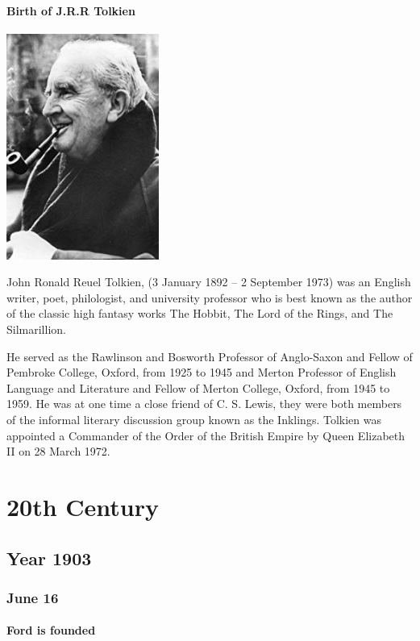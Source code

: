 \documentclass[11pt]{report}
\begin{document}
\subsection{Birth of J.R.R Tolkien}
\vspace{2mm}\begin{center}\includegraphics[width=5cm]{./img/jrrtolkien.jpg}\end{center}
John Ronald Reuel Tolkien, (3 January 1892 – 2 September 1973) was an English writer, poet, philologist, and university professor who is best known as the author of the classic high fantasy works The Hobbit, The Lord of the Rings, and The Silmarillion.

He served as the Rawlinson and Bosworth Professor of Anglo-Saxon and Fellow of Pembroke College, Oxford, from 1925 to 1945 and Merton Professor of English Language and Literature and Fellow of Merton College, Oxford, from 1945 to 1959. He was at one time a close friend of C. S. Lewis, they were both members of the informal literary discussion group known as the Inklings. Tolkien was appointed a Commander of the Order of the British Empire by Queen Elizabeth II on 28 March 1972.




										
			
\part{20th Century}
\chapter{Year 1903}
\section{June 16}
\subsection{Ford is founded}
\end{document}

